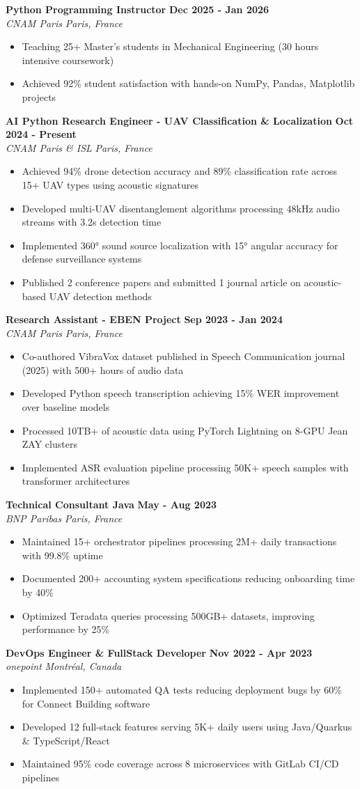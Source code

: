 \documentclass[10pt,letterpaper]{article}
\newcommand{\resumeItem}[1]{\item\footnotesize{#1}}
\newenvironment{resumeExperience}[4]{
    \vspace{1pt}
    \textbf{\small #1} \hfill \textbf{\small #2} \\
    \textit{\small #3} \hfill \textit{\small #4}
    \vspace{0pt}
    \begin{itemize}[leftmargin=*,noitemsep,topsep=0pt,itemsep=0pt]
}{
    \end{itemize}
    \vspace{2pt}
}
\begin{document}
\begin{resumeExperience}{Python Programming Instructor}{Dec 2025 - Jan 2026}{CNAM Paris}{Paris, France}
    \resumeItem{Teaching 25+ Master's students in Mechanical Engineering (30 hours intensive coursework)}
    \resumeItem{Achieved 92\% student satisfaction with hands-on NumPy, Pandas, Matplotlib projects}
\end{resumeExperience}

\begin{resumeExperience}{AI Python Research Engineer - UAV Classification \& Localization}{Oct 2024 - Present}{CNAM Paris \& ISL}{Paris, France}
    \resumeItem{Achieved 94\% drone detection accuracy and 89\% classification rate across 15+ UAV types using acoustic signatures}
    \resumeItem{Developed multi-UAV disentanglement algorithms processing 48kHz audio streams with 3.2s detection time}
    \resumeItem{Implemented 360° sound source localization with 15° angular accuracy for defense surveillance systems}
    \resumeItem{Published 2 conference papers and submitted 1 journal article on acoustic-based UAV detection methods}
\end{resumeExperience}

\begin{resumeExperience}{Research Assistant - EBEN Project}{Sep 2023 - Jan 2024}{CNAM Paris}{Paris, France}
    \resumeItem{Co-authored VibraVox dataset published in Speech Communication journal (2025) with 500+ hours of audio data}
    \resumeItem{Developed Python speech transcription achieving 15\% WER improvement over baseline models}
    \resumeItem{Processed 10TB+ of acoustic data using PyTorch Lightning on 8-GPU Jean ZAY clusters}
    \resumeItem{Implemented ASR evaluation pipeline processing 50K+ speech samples with transformer architectures}
\end{resumeExperience}

\begin{resumeExperience}{Technical Consultant Java}{May - Aug 2023}{BNP Paribas}{Paris, France}
    \resumeItem{Maintained 15+ orchestrator pipelines processing 2M+ daily transactions with 99.8\% uptime}
    \resumeItem{Documented 200+ accounting system specifications reducing onboarding time by 40\%}
    \resumeItem{Optimized Teradata queries processing 500GB+ datasets, improving performance by 25\%}
\end{resumeExperience}

\begin{resumeExperience}{DevOps Engineer \& FullStack Developer}{Nov 2022 - Apr 2023}{onepoint}{Montréal, Canada}
    \resumeItem{Implemented 150+ automated QA tests reducing deployment bugs by 60\% for Connect Building software}
    \resumeItem{Developed 12 full-stack features serving 5K+ daily users using Java/Quarkus \& TypeScript/React}
    \resumeItem{Maintained 95\% code coverage across 8 microservices with GitLab CI/CD pipelines}
\end{resumeExperience}
\end{document}
